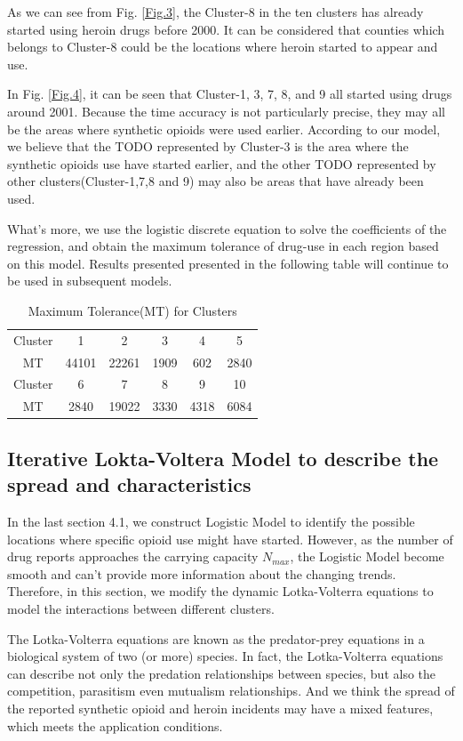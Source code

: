 \documentclass[11pt]{article}
\begin{document}
As we can see from Fig. \ref{Fig.3}, the Cluster-8 in the ten clusters has already started using heroin drugs before 2000. It can be considered that counties which belongs to Cluster-8 could be the locations where heroin started to appear and use.

In Fig. \ref{Fig.4}, it can be seen that Cluster-1, 3, 7, 8, and 9 all started using drugs around 2001. Because the time accuracy is not particularly precise, they may all be the areas where synthetic opioids were used earlier. According to our model, we believe that the TODO represented by Cluster-3 is the area where the synthetic opioids use have started earlier, and the other TODO represented by other clusters(Cluster-1,7,8 and 9) may also be areas that have already been used.

What’s more, we use the logistic discrete equation to solve the coefficients of the regression, and obtain the maximum tolerance of drug-use in each region based on this model. Results presented presented in the following table will continue to be used in subsequent models.
\begin{table}[H]
	\centering
	\caption{Maximum Tolerance(MT) for Clusters}
	\begin{tabular}
	{cccccc}
	\toprule[1pt]
	Cluster	& 1 & 2 & 3 & 4 &5 \\
	MT	& 44101 & 22261 & 1909 & 602 & 2840\\
	\midrule
	Cluster	& 6 & 7 &  8 & 9 & 10 \\
	MT & 2840 & 19022 & 3330 & 4318 & 6084\\
	\bottomrule[1pt]
	\end{tabular}
\end{table}

\subsection{Iterative Lokta-Voltera Model to describe the spread and characteristics}
In the last section 4.1, we construct Logistic Model to identify the possible locations where specific opioid use might have started. However, as the number of drug reports approaches the carrying capacity $N_{max}$, the Logistic Model become smooth and can’t provide more information about the changing trends. Therefore, in this section, we modify the dynamic Lotka-Volterra equations to model the interactions between different clusters.
	
The Lotka-Volterra equations are known as the predator-prey equations in a biological system of two (or more) species. In fact, the Lotka-Volterra equations can describe not only the predation relationships between species, but also the competition, parasitism even mutualism relationships. And we think the spread of the reported synthetic opioid and heroin incidents may have a mixed features, which meets the application conditions.
\end{document}
